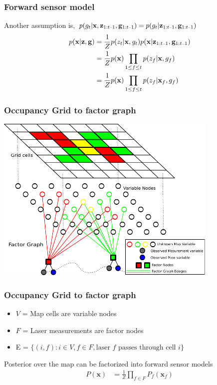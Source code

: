 \documentclass{beamer}
\newcommand{\vect}[1]{\mathbf{#1}}
\newcommand{\map}{\vect{x}}
\newcommand{\meas}{z}
\newcommand{\measurements}{\vect{\meas}}
\newcommand{\pose}{g}
\newcommand{\poses}{\vect{\pose}}
\newcommand{\unaryminus}{\scalebox{0.5}[0.5]{\( - \)}}
\newcommand{\prevtime}{1:t\unaryminus1}
\newcommand{\remaining}{\measurements_{\prevtime}, \poses_{\prevtime}}
\begin{document}
\begin{frame}
  \frametitle{Forward sensor model}

  Another assumption is, $p(g_t|\map, \remaining) = p(g_t|\remaining)$
  \begin{align}
    p(\map | \measurements, \poses) &= \frac{1}{Z} p(z_t|\map , g_t)p(\map| \remaining)\\
                                    &= \frac{1}{Z} p(\map)\prod_{1 \le f \le t}
    p(z_f|\map, g_f)\\
                                    &= \frac{1}{Z} p(\map)\prod_{1 \le f \le t}
    p(z_f|\map_f, g_f)\\
  \end{align}
\end{frame}

\begin{frame}
\frametitle{Occupancy Grid to factor graph}
\hfill
\includegraphics[trim=0in 0in 0in 0in, width=0.8\textwidth]{figures/factorgraph/factorgraph3.pdf}
\end{frame}

\begin{frame}
  \frametitle{Occupancy Grid to factor graph}
  \begin{itemize}
      \item $V$ = Map cells are variable nodes
      \item $F$ = Laser measurements are factor nodes
      \item E = $\{(i, f) : i \in V, f \in F, \text{laser $f$ passes through cell $i$}\}$
  \end{itemize}
  Posterior over the map can be factorized into forward sensor models
  \begin{align}
    P(\map) &= \frac{1}{Z}\prod_{f \in F} P_f(\map_f)
  \end{align}
\end{frame}
\end{document}
